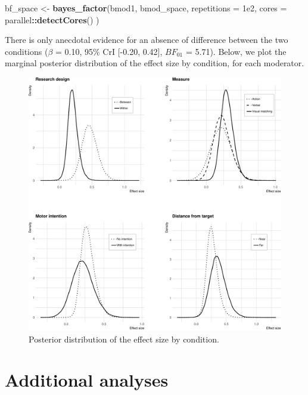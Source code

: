 \documentclass[floatsintext,doc]{apa6}
\newenvironment{Shaded}{\begin{snugshade}}{\end{snugshade}}
\newcommand{\DataTypeTok}[1]{\textcolor[rgb]{0.13,0.29,0.53}{#1}}
\newcommand{\FloatTok}[1]{\textcolor[rgb]{0.00,0.00,0.81}{#1}}
\newcommand{\KeywordTok}[1]{\textcolor[rgb]{0.13,0.29,0.53}{\textbf{#1}}}
\newcommand{\NormalTok}[1]{#1}
\newcommand{\OperatorTok}[1]{\textcolor[rgb]{0.81,0.36,0.00}{\textbf{#1}}}
\newcommand{\StringTok}[1]{\textcolor[rgb]{0.31,0.60,0.02}{#1}}
\begin{document}
\begin{Shaded}
\begin{Highlighting}[]
\NormalTok{bf_space <-}\StringTok{ }\KeywordTok{bayes_factor}\NormalTok{(bmod1, bmod_space, }\DataTypeTok{repetitions =} \FloatTok{1e2}\NormalTok{, }\DataTypeTok{cores =}\NormalTok{ parallel}\OperatorTok{::}\KeywordTok{detectCores}\NormalTok{() )}
\end{Highlighting}
\end{Shaded}

There is only anecdotal evidence for an absence of difference between the two conditions (\(\beta\) = 0.10, 95\% CrI {[}-0.20, 0.42{]}, \(BF_{01}\) = 5.71). Below, we plot the marginal posterior distribution of the effect size by condition, for each moderator.

\begin{figure}[H]

{\centering \includegraphics{supplementary_materials_files/figure-latex/unnamed-chunk-36-1} 

}

\caption{Posterior distribution of the effect size by condition.}\label{fig:unnamed-chunk-36}
\end{figure}

\hypertarget{additional-analyses}{%
\section{Additional analyses}\label{additional-analyses}}
\end{document}
